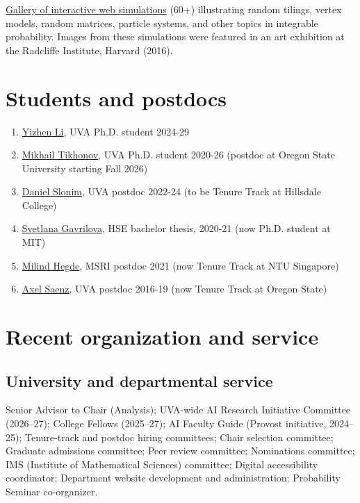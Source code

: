 \documentclass[letterpaper,11pt]{article}
\begin{document}
\href{https://lpetrov.cc/simulations/}{Gallery of interactive web simulations}
(60+) illustrating random tilings, vertex models, random matrices, particle systems, and other topics in integrable probability.
Images from these simulations were featured in an art exhibition at the Radcliffe Institute, Harvard (2016).

\section*{Students and postdocs}

\begin{enumerate}
    \item \href{https://math.virginia.edu/people/smb2tp/}{Yizhen Li}, UVA Ph.D. student 2024-29
    \item \href{https://mtikhonov.com}{Mikhail Tikhonov}, UVA Ph.D. student 2020-26 (postdoc at Oregon State University starting Fall 2026)
    \item \href{https://danielslonim.github.io}{Daniel Slonim}, UVA postdoc 2022-24 (to be Tenure Track at Hillsdale College)
    \item \href{https://math.mit.edu/directory/profile.html?pid=2588}{Svetlana Gavrilova},  HSE bachelor thesis, 2020-21 (now Ph.D. student at MIT)
    \item \href{https://milindhegde.github.io/}{Milind Hegde}, MSRI postdoc 2021 (now Tenure Track at NTU Singapore)
    \item \href{https://sites.google.com/view/axelsaenz}{Axel Saenz}, UVA postdoc 2016-19 (now Tenure Track at Oregon State)
\end{enumerate}

\section*{Recent organization and service}

\subsection*{University and departmental service}

Senior Advisor to Chair (Analysis);
UVA-wide AI Research Initiative Committee (2026--27);
College Fellows (2025--27);
AI Faculty Guide (Provost initiative, 2024--25);
Tenure-track and postdoc hiring committees;
Chair selection committee;
Graduate admissions committee;
Peer review committee;
Nominations committee;
IMS (Institute of Mathematical Sciences) committee;
Digital accessibility coordinator;
Department website development and administration;
Probability Seminar co-organizer.
\end{document}
